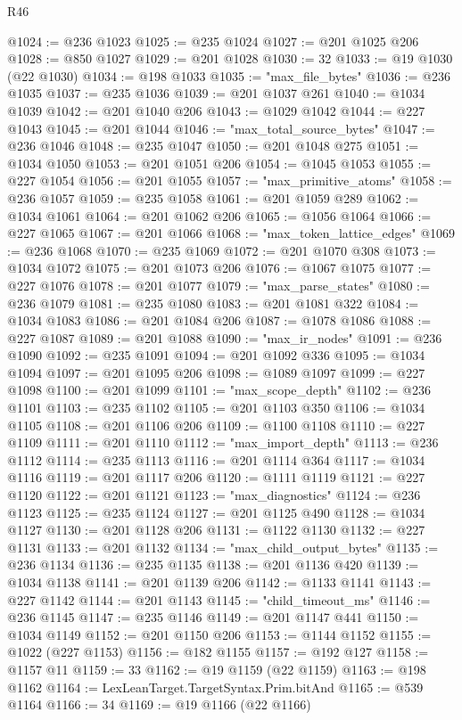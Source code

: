 \begin{lexlean}{R46}
\begin{coremodule}
@1024 := @236 @1023
@1025 := @235 @1024
@1027 := @201 @1025 @206
@1028 := @850 @1027
@1029 := @201 @1028
@1030 := 32
@1033 := @19 @1030 (@22 @1030)
@1034 := @198 @1033
@1035 := "max_file_bytes"
@1036 := @236 @1035
@1037 := @235 @1036
@1039 := @201 @1037 @261
@1040 := @1034 @1039
@1042 := @201 @1040 @206
@1043 := @1029 @1042
@1044 := @227 @1043
@1045 := @201 @1044
@1046 := "max_total_source_bytes"
@1047 := @236 @1046
@1048 := @235 @1047
@1050 := @201 @1048 @275
@1051 := @1034 @1050
@1053 := @201 @1051 @206
@1054 := @1045 @1053
@1055 := @227 @1054
@1056 := @201 @1055
@1057 := "max_primitive_atoms"
@1058 := @236 @1057
@1059 := @235 @1058
@1061 := @201 @1059 @289
@1062 := @1034 @1061
@1064 := @201 @1062 @206
@1065 := @1056 @1064
@1066 := @227 @1065
@1067 := @201 @1066
@1068 := "max_token_lattice_edges"
@1069 := @236 @1068
@1070 := @235 @1069
@1072 := @201 @1070 @308
@1073 := @1034 @1072
@1075 := @201 @1073 @206
@1076 := @1067 @1075
@1077 := @227 @1076
@1078 := @201 @1077
@1079 := "max_parse_states"
@1080 := @236 @1079
@1081 := @235 @1080
@1083 := @201 @1081 @322
@1084 := @1034 @1083
@1086 := @201 @1084 @206
@1087 := @1078 @1086
@1088 := @227 @1087
@1089 := @201 @1088
@1090 := "max_ir_nodes"
@1091 := @236 @1090
@1092 := @235 @1091
@1094 := @201 @1092 @336
@1095 := @1034 @1094
@1097 := @201 @1095 @206
@1098 := @1089 @1097
@1099 := @227 @1098
@1100 := @201 @1099
@1101 := "max_scope_depth"
@1102 := @236 @1101
@1103 := @235 @1102
@1105 := @201 @1103 @350
@1106 := @1034 @1105
@1108 := @201 @1106 @206
@1109 := @1100 @1108
@1110 := @227 @1109
@1111 := @201 @1110
@1112 := "max_import_depth"
@1113 := @236 @1112
@1114 := @235 @1113
@1116 := @201 @1114 @364
@1117 := @1034 @1116
@1119 := @201 @1117 @206
@1120 := @1111 @1119
@1121 := @227 @1120
@1122 := @201 @1121
@1123 := "max_diagnostics"
@1124 := @236 @1123
@1125 := @235 @1124
@1127 := @201 @1125 @490
@1128 := @1034 @1127
@1130 := @201 @1128 @206
@1131 := @1122 @1130
@1132 := @227 @1131
@1133 := @201 @1132
@1134 := "max_child_output_bytes"
@1135 := @236 @1134
@1136 := @235 @1135
@1138 := @201 @1136 @420
@1139 := @1034 @1138
@1141 := @201 @1139 @206
@1142 := @1133 @1141
@1143 := @227 @1142
@1144 := @201 @1143
@1145 := "child_timeout_ms"
@1146 := @236 @1145
@1147 := @235 @1146
@1149 := @201 @1147 @441
@1150 := @1034 @1149
@1152 := @201 @1150 @206
@1153 := @1144 @1152
@1155 := @1022 (@227 @1153)
@1156 := @182 @1155
@1157 := @192 @127
@1158 := @1157 @11
@1159 := 33
@1162 := @19 @1159 (@22 @1159)
@1163 := @198 @1162
@1164 := LexLeanTarget.TargetSyntax.Prim.bitAnd
@1165 := @539 @1164
@1166 := 34
@1169 := @19 @1166 (@22 @1166)

\end{coremodule}
\end{lexlean}
